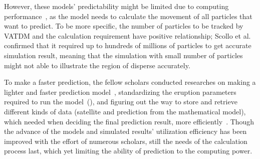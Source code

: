 \documentclass{article}
\begin{document}
\begin{doublespacing}
{  However, these models’ predictability might be limited due to computing 
  performance~\cite[p.745-746]{Tanaka2022}, as the model needs to calculate the movement of all 
  particles that want to predict. To be more specific, the number of particles to be tracked by 
  VATDM and the calculation requirement have positive relationship; Scollo et al. 
  \cite{SCOLLO2011129} confirmed that it required up to hundreds of millions of particles to get 
  accurate simulation result, meaning that the simulation with small number of particles might not 
  able to illustrate the region of disperse accurately.

  To make a faster prediction, the fellow scholars conducted researches on making a lighter and 
  faster prediction model~\cite{Searcy1998}, standardizing the eruption parameters required to run 
  the model~(\cite[p.7]{Webley2009}), and figuring out the way to store and retrieve different kinds
  of data (satellite and prediction from the mathematical model), which needed when deciding the 
  final prediction result, more efficiently~\cite{Sorokin2016}. Though the advance of the models and
  simulated results' utilization efficiency has been improved with the effort of numerous scholars,
  still the needs of the calculation process last, which yet limiting the ability of prediction to 
  the computing power.

  \fontsize{10pt}{10.5pt} 

}
\end{doublespacing}
\end{document}
